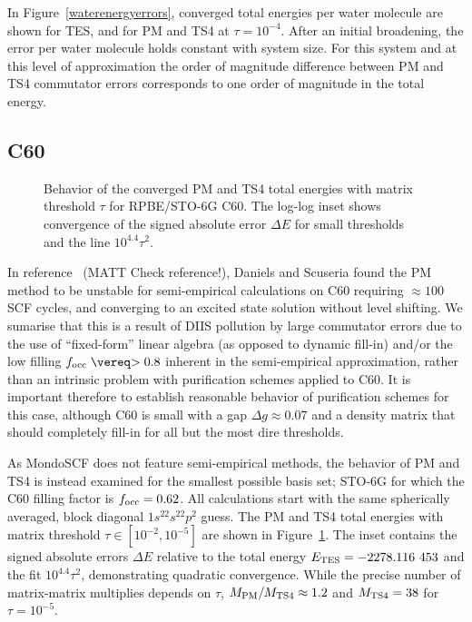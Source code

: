 \commentoutA{\documentclass[prb,aps,twocolumn,twocolumngrid,secnumarabic,superbib,hyperref]{revtex4}}
\begin{document}
{In Figure~\ref{waterenergyerrors}, 
converged total energies per water molecule are shown for TES, and for PM and TS4 at
$\tau=10^{-4}$.  After an initial broadening, the error per water molecule 
holds constant with system size.  For this system and at this level of 
approximation the order of magnitude difference between PM and TS4 commutator errors 
corresponds to one order of magnitude in the total energy.  

\subsection{C60}

\begin{figure}[h]
\caption{Behavior of the converged PM and TS4 total energies with matrix threshold $\tau$
         for RPBE/STO-6G C60.  The log-log inset shows 
         convergence of the signed absolute error $\Delta E$ for small 
         thresholds and the line $10^{4.4} \tau^2$.}\label{c60convergence}
\end{figure}



In reference~ (MATT Check reference!), Daniels and Scuseria found the PM method to be 
unstable for semi-empirical calculations on C60 requiring  $\approx 100$ SCF
cycles, and converging to an excited state solution without level shifting.  
We sumarise that this is a result of DIIS pollution 
by large commutator errors due to the use of ``fixed-form'' 
linear algebra (as opposed to dynamic fill-in) and/or the low filling 
$f_{\rm occ} \gtrsim 0.8$ inherent in the semi-empirical approximation, rather
than an intrinsic problem with purification schemes applied to C60.   
It is important therefore to establish reasonable behavior of purification schemes 
for this case,  although  C60 is small with a gap $\Delta g\approx 0.07$ and a
density matrix that should completely fill-in for all but the most dire thresholds. 

As {\sc MondoSCF} does not feature semi-empirical methods, the behavior of PM and TS4 
is instead examined for the smallest possible basis set; STO-6G for which the 
C60 filling factor is $f_{\rm occ}=0.62$. All calculations start with the same spherically 
averaged, block diagonal $1s^22s^22p^2$ guess. The PM and TS4 total 
energies with matrix threshold $\tau \in [10^{-2},10^{-5}]$ are shown in 
Figure~\ref{c60convergence}.  The inset contains the signed absolute errors 
$\Delta E$ relative to the total energy $E_{\rm TES}=-2278.116~453$ and the fit 
$10^{4.4} \tau^2$, demonstrating quadratic convergence. 
While the precise number of matrix-matrix multiplies depends on $\tau$,
$M_{\rm PM}/M_{\rm TS4} \approx 1.2$ and $M_{\rm TS4}=38$ for $\tau=10^{-5}$.

}
\end{document}
